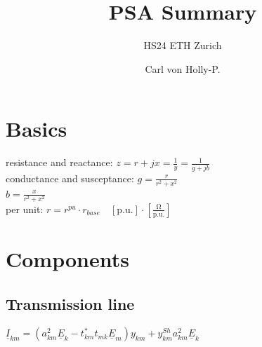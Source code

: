 \documentclass[a4paper,10pt,landscape]{scrartcl}
\title{PSA Summary}
\subtitle{HS24 ETH Zurich}
\author{Carl von Holly-P.}
\begin{document}
\begin{multicols*}{3}
%
\maketitle
\section{Basics}
resistance and reactance:
$z=r+jx=\frac{1}{y} = \frac{1}{g + jb}$ \\
conductance and susceptance:
$g=\frac{r}{r^2 + x^2}$ \\
$b=\frac{x}{r^2 + x^2}$ \\
per unit: $r=r^{pu}\cdot r_{base}\quad\left[\mathrm{p.u.}\right]\cdot\left[\mathrm{\frac{\Omega}{p.u.}}\right]$
\section{Components}
\subsection{Transmission line}
$\underline{I}_{k m}=\left(a_{k m}^2 \underline{E}_k-t_{k m}^* t_{m k} \underline{E}_m\right) y_{k m}+y_{k m}^{S h} a_{k m}^2 \underline{E}_k$


\end{multicols*}
\end{document}
